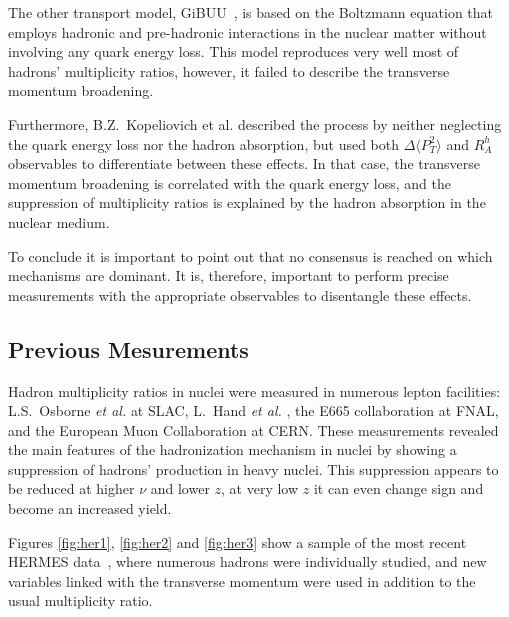 The other transport model, GiBUU~\cite{Gallmeister:2007an}, is based on the 
Boltzmann equation that employs hadronic and pre-hadronic interactions in the nuclear matter without involving any quark energy loss. This model reproduces very well most of hadrons' multiplicity ratios, however, it failed to describe the transverse momentum broadening. 

Furthermore, B.Z.~Kopeliovich et al. \cite{Kopeliovich:2008uy} described the process by neither neglecting the quark energy loss nor the hadron absorption, but used both $\Delta \langle P_T^2 \rangle$ and $R_A^h$ observables to differentiate between these effects. In that case, the transverse momentum broadening is correlated with the quark energy loss, and the suppression of multiplicity ratios is explained by the hadron absorption in the nuclear medium.

To conclude it is important to point out that no consensus is reached on which 
mechanisms are dominant. It is, therefore, important to perform precise measurements with the appropriate observables to disentangle these effects.


\subsection{Previous Mesurements}
\label{sec:exp}

Hadron multiplicity ratios in nuclei were measured in numerous lepton 
facilities: L.S.~Osborne {\it et al.} \cite{Osborne:1978ai} at SLAC,
L.~Hand {\it et al.} \cite{Hand:1978tx}, the E665 collaboration \cite{Adams:1994ri} at FNAL, and the European Muon Collaboration \cite{Arvidson:1984fz,Ashman:1991cx} at CERN. These measurements revealed the main features of the hadronization mechanism
in nuclei by showing a suppression of hadrons' production in heavy nuclei.
This suppression appears to be reduced at higher $\nu$ and lower $z$, at very 
low $z$ it can even change sign and become an increased yield. 

Figures \ref{fig:her1}, \ref{fig:her2} and \ref{fig:her3} show a sample of 
the most recent HERMES data~\cite{Airapetian:2007vu}, where numerous hadrons were individually studied, and new variables linked with the transverse momentum were used in addition to the usual multiplicity ratio.

